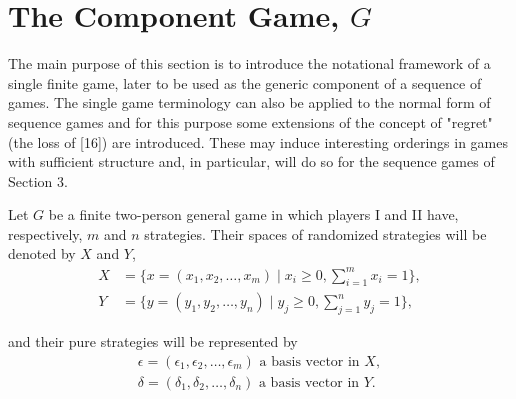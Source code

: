 \documentclass[11pt]{article}
\numberwithin{equation}{section}
\theoremstyle{boldStyle}
\begin{document}
\section{The Component Game, $G$}

The main purpose of this section is to introduce the notational framework of a single finite game, later to be used as the generic component of a sequence of games. The single game terminology can also be applied to the normal form of sequence games and for this purpose some extensions of the concept of "regret" (the loss of [16]) are introduced. These may induce interesting orderings in games with sufficient structure and, in particular, will do so for the sequence games of Section 3.

\medbreak

Let $G$ be a finite two-person general game in which players I and II have, respectively, $m$ and $n$ strategies. Their spaces of randomized strategies will be denoted by $X$ and $Y$,
\begin{equation} \label{eq:2.1}
        \begin{aligned}
            X &= \{x = (x_1, x_2, \ldots, x_m) \mid x_i \geq 0, \sum_{i=1}^m x_i = 1\}, \\
            Y &= \{y = (y_1, y_2, \ldots, y_n) \mid y_j \geq 0, \sum_{j=1}^n y_j = 1\},
        \end{aligned}
\end{equation}

and their pure strategies will be represented by
\begin{equation} \label{eq:2.2}
    \begin{aligned}
        \epsilon = (\epsilon_1, \epsilon_2, \ldots, \epsilon_m) \text{ a basis vector in } X, \\
        \delta = (\delta_1, \delta_2, \ldots, \delta_n) \text{ a basis vector in } Y.
\   \end{aligned}   
\end{equation}
\end{document}
